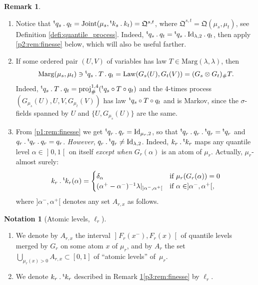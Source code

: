 \documentclass[JEP,XML,SOM,Unicode,NoEqCountersInSection,NoFloatCountersInSection,published]{cedram}
\newcommand{\ldot}{\mathbin{.}}
\theoremstyle{plain}
\theoremstyle{definition}
\newtheorem{notation}[them]{Notation} %
\newtheorem{rem}[them]{Remark}
\newcommand{\id}{\mathrm{Id}}
\newcommand{\join}{\mathrm{Joint}}
\newcommand{\como}{\mathfrak{Q}}
\newcommand{\trans}{{}^{\mathrm{t}}\mkern-1mu}
\newcommand{\la}{\lambda}
\newcommand{\ma}{\mathrm{Marg}}
\newcommand{\law}{\operatorname{Law}}
\newcommand{\pr}{\operatorname{proj}}
\newcommand{\op}{\mathopen}
\newcommand{\clo}{\mathclose}
\begin{document}
\skpt
\begin{rem}\label{rem:finesse}
\begin{enumerate}
\item
\label{p1:rem:finesse} Notice that $\trans{q}_s \ldot q_t=\join(\mu_s,\trans{k}_s \ldot k_t)=\como^{s,t}$, where $\como^{s,t}=\como(\mu_s,\mu_t)$, see Definition \ref{defi:quantile_process}. Indeed, $\trans{q}_s \ldot q_t=\trans{q}_s \ldot\id_{\la,2}{}\ldot q_t$, then apply \eqref{p2:rem:finesse} below,
which will also be useful farther.

\item
\label{p2:rem:finesse} If some ordered pair $(U,V)$ of variables has law $T\in \ma(\la,\la)$, then\vspace*{-3pt}
\[
\ma(\mu_s,\mu_t)\ni\trans{q}_s \ldot T\ldot q_t=\law(G_s(U),G_t(V))=(G_s\otimes G_t)_\#T.
\]
Indeed, $\trans{q}_s \ldot T\ldot q_t=\pr^{1,4}_\#(\trans{q}_s \circ T\circ q_t)$ and the 4-times process $(G_{\mu_s}(U),U,V,G_{\mu_t}(V))$ has law $\trans{q}_s \circ T\circ q_t$ and is Markov, since the $\sigma$-fields spanned by $U$ and $\{U,G_{\mu_s}(U)\}$ are the same.

\item
\label{p3:rem:finesse} From \eqref{p1:rem:finesse} we get $\trans q_r\ldot q_r=\id_{\mu_r,2}$, so that $\trans q_r\ldot q_r\ldot\trans q_r=\trans q_r$ and $q_r\ldot\trans q_r\ldot q_r=q_r$. \emph{However}, $q_r\ldot\trans q_r\neq \id_{\la,2}$. Indeed, $k_r\ldot\trans{k}_r$ maps any quantile level $\alpha\in \op]0,1\clo[$ on itself \emph{except when} $G_r(\alpha)$ is an atom of $\mu_r$. Actually, $\mu_r$-almost surely:\vspace*{-3pt}
\begin{align*}
k_r\ldot\trans{k}_r(\alpha)=
\begin{cases}
\delta_\alpha&\text{if }\mu_r(G_{r}(\alpha))=0\\
(\alpha^+-\alpha^-)^{-1}\la|_{]\alpha^-,\alpha^+[}&\text{if }\alpha\in]\alpha^-,\alpha^+[,
\end{cases}
\end{align*}
where $]\alpha^-,\alpha^+[$ denotes any set $A_{r,x}$ as follows.
\end{enumerate}
\end{rem}

\skpt
\begin{notation}[Atomic levels, $\ell_r$]\label{nota:Asx}
\begin{enumerate}
\item
\label{p:Asx} We denote by $A_{r,x}$ the interval $\op]F_r(x^-),F_r(x)\clo[$ of quantile levels merged by $G_r$ on some atom $x$ of $\mu_r$, and by $A_r$ the set $\bigcup_{\mu_r(x)>0}A_{r,x}\!\subset\! [0,1]$ of ``atomic levels'' of~$\mu_r$.

\item
\label{p:l_R_fini} We denote $k_r\ldot\trans{k}_r$ described in Remark \ref{rem:finesse}\eqref{p3:rem:finesse} by $\ell_r$.
\end{enumerate}
\end{notation}
\end{document}
